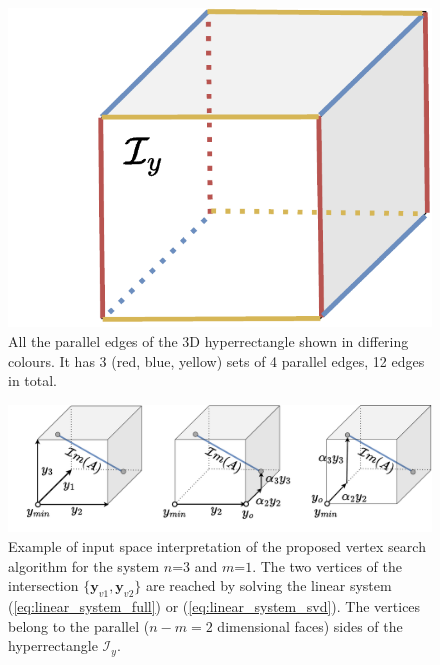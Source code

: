\begin{figure}
\vspace{-1.5cm}
    \centering
    \includegraphics[width=\linewidth]{Papers/images/parallel.pdf}
    \caption{All the parallel edges of the 3D hyperrectangle shown in differing colours. It has 3 (red, blue, yellow) sets of 4 parallel edges, 12 edges in total.}
    \label{fig:parallel}
\end{figure}

\begin{figure}[!t]
    \centering
    \includegraphics[width=0.9\linewidth]{Papers/images/intersection_example.pdf}
    \caption{Example of input space interpretation of the proposed vertex search algorithm for the system $n$=$3$ and $m$=$1$. The two vertices of the intersection $\{\bm{y}_{v1},\bm{y}_{v2}\}$ are reached by solving the linear system (\ref{eq:linear_system_full}) or (\ref{eq:linear_system_svd}). The vertices belong to the parallel ($n\!-\!m\!=\!2$ dimensional faces) sides of the hyperrectangle $\mathcal{I}_y$.  }
    \label{fig:intersection_example}
\end{figure}


